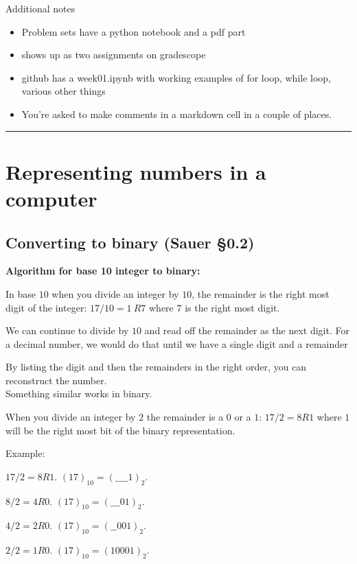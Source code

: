 \documentclass[12pt,letterpaper,noanswers]{exam}
\begin{document}
Additional notes
\begin{itemize}
\item Problem sets have a python notebook and a pdf part
\item shows up as two assignments on gradescope
\item github has a week01.ipynb with working examples of for loop, while loop, various other things
\item You're asked to make comments in a markdown cell in a couple of places.
\end{itemize}

\vspace{0.2cm}
\hrule
\vspace{0.2cm}

\section{Representing numbers in a computer}
\subsection{Converting to binary (Sauer \S0.2)}
\textbf{Algorithm for base 10 integer to binary:}
\begin{tcolorbox}


In base $10$ when you divide an integer by $10$, the remainder is the right most digit of the integer: $17/10 = 1\ R7$ where $7$ is the right most digit.

We can continue to divide by $10$ and read off the remainder as the next digit.  For a decimal number, we would do that until we have a single digit and a remainder

By listing the digit and then the remainders in the right order, you can reconstruct the number. \\


Something similar works in binary.

When you divide an integer by $2$ the remainder is a $0$ or a $1$:
$17/2 = 8 R1$ where $1$ will be the right most bit of the binary representation.


\end{tcolorbox}

Example:

$17/2 = 8 R1$.  $(17)_{10} = (\_ \_ \_ \_ 1)_2$.

$8/2 = 4 R0$.  $(17)_{10} = (\_ \_ \_ 0 1)_2$.

$4/2 = 2 R0$.  $(17)_{10} = (\_ \_ 0 0 1)_2$.

$2/2 = 1 R0$.  $(17)_{10} = (1 0 0 0 1)_2$.
\end{document}
